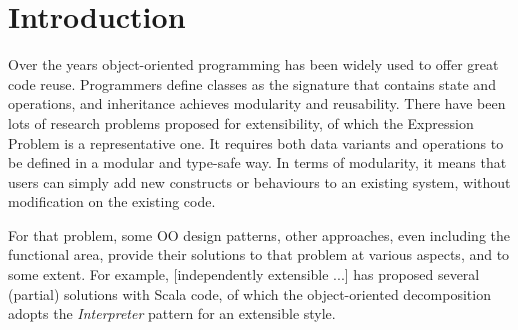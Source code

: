 \section{Introduction}\label{sec:introduction}

Over the years object-oriented programming has been widely used to offer great code reuse.
Programmers define classes as the signature that contains state and operations, and inheritance
achieves modularity and reusability. There have been lots of research problems proposed for
extensibility, of which the Expression Problem is a representative one. It requires both data variants
and operations to be defined in a modular and type-safe way. In terms of modularity, it means that users
can simply add new constructs or behaviours to an existing system, without modification on the existing code.

For that problem, some OO design patterns,
other approaches, even including the functional area, provide their solutions to that problem at various
aspects, and to some extent. For example, [independently extensible ...] has proposed several (partial) solutions with Scala code,
of which the object-oriented decomposition adopts the \textit{Interpreter} pattern for an extensible style. 